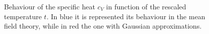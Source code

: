 \documentclass[../main/main.tex]{subfiles}
\begin{document}
\begin{figure}[h!]
\begin{minipage}[c]{0.5\linewidth}
\end{minipage}
\begin{minipage}[]{0.5\linewidth}
\centering
{}
\end{minipage}
\caption{\label{fig:} Behaviour of the specific heat \( c_V \) in function of the rescaled temperature \( t \). In blue it is represented its behaviour in the mean field theory, while in red the one with Gaussian approximations.}
\end{figure}
\end{document}
